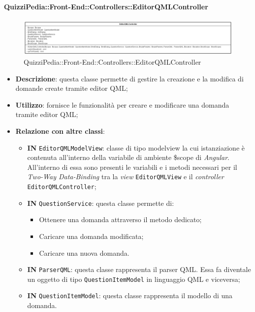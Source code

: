 \paragraph{QuizziPedia::Front-End::Controllers::EditorQMLController}
\begin{figure} [ht]
	\centering
	\includegraphics[scale=0.25]{UML/Classi/Front-End/QuizziPedia_Front-end_Controller_EditorQMLController.png}
	\caption{QuizziPedia::Front-End::Controllers::EditorQMLController}
\end{figure} \FloatBarrier
\begin{itemize}
	\item \textbf{Descrizione}: questa classe permette di gestire la creazione e la modifica di domande create tramite editor QML;
	\item \textbf{Utilizzo}: fornisce le funzionalità per creare e modificare una domanda tramite editor QML;
	\item \textbf{Relazione con altre classi}:
	\begin{itemize}
		\item \textbf{IN} \texttt{EditorQMLModelView}: classe di tipo modelview la cui istanziazione è contenuta all'interno della variabile di ambiente \$scope di \textit{Angular}. All'interno di essa sono presenti le variabili e i metodi necessari per il \textit{Two-Way Data-Binding} tra la \textit{view} \texttt{EditorQMLView} e il \textit{controller} \texttt{EditorQMLController};
		\item \textbf{IN} \texttt{QuestionService}: questa classe permette di:
		\begin{itemize}
			\item Ottenere una domanda attraverso il metodo dedicato;
			\item Caricare una domanda modificata;
			\item Caricare una nuova domanda.
		\end{itemize}
		\item \textbf{IN} \texttt{ParserQML}: questa classe rappresenta il parser QML. Essa fa diventale un oggetto di tipo \texttt{QuestionItemModel} in linguaggio QML e viceversa;
		\item \textbf{IN} \texttt{QuestionItemModel}: questa classe rappresenta il modello di una domanda.

\end{itemize}
\end{itemize}
